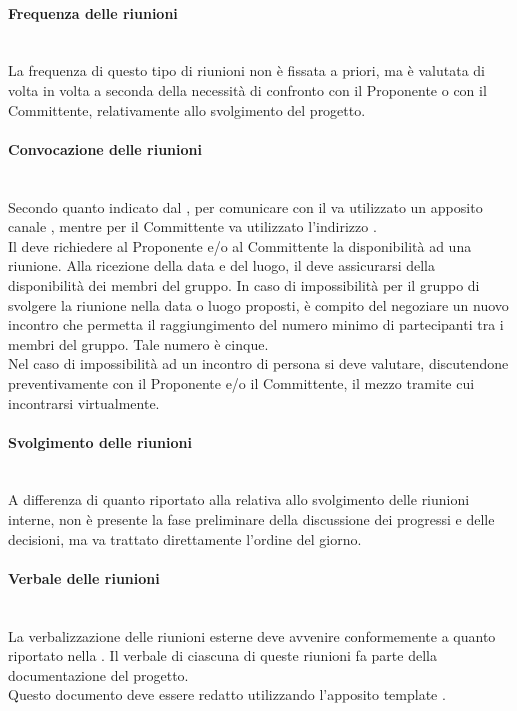 \paragraph{Frequenza delle riunioni}\mbox{}\\
La frequenza di questo tipo di riunioni non è fissata a priori, ma è valutata di volta in volta a seconda della necessità di confronto con il Proponente o con il Committente, relativamente allo svolgimento del progetto.

\paragraph{Convocazione delle riunioni}\mbox{}\\
Secondo quanto indicato dal \Proponente, per comunicare con il \Proponente va utilizzato un apposito canale , mentre per il Committente va utilizzato l'indirizzo \email{} \href{mailto:\GroupEmail}{\GroupEmail}.\\
Il \Responsabile{} deve richiedere al Proponente e/o al Committente la disponibilità ad una riunione. Alla ricezione della data e del luogo, il \Responsabile{} deve assicurarsi della disponibilità dei membri del gruppo. In caso di impossibilità per il gruppo di svolgere la riunione nella data o luogo proposti, è compito del \Responsabile{} negoziare un nuovo incontro che permetta il raggiungimento del numero minimo di partecipanti tra i membri del gruppo. Tale numero è cinque.\\
Nel caso di impossibilità ad un incontro di persona si deve valutare, discutendone preventivamente con il Proponente e/o il Committente, il mezzo tramite cui incontrarsi virtualmente.

\paragraph{Svolgimento delle riunioni}\mbox{}\\
A differenza di quanto riportato alla  relativa allo svolgimento delle riunioni interne, non è presente la fase preliminare della discussione dei progressi e delle decisioni, ma va trattato direttamente l'ordine del giorno.

\paragraph{Verbale delle riunioni}\mbox{}\\
La verbalizzazione delle riunioni esterne deve avvenire conformemente a quanto riportato nella . Il verbale di ciascuna di queste riunioni fa parte della documentazione del progetto.\\
Questo documento deve essere redatto utilizzando l'apposito template \glossario{\LaTeX{}}.

